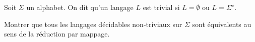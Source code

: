 
\begingroup

\begin{exercice}
  Soit $\Sigma$ un alphabet. 
  On dit qu'un langage $L$ est trivial si $L= \emptyset$ ou $L=\Sigma^\star$.
  \begin{questions}
  \item Montrer que tous les langages décidables non-triviaux sur $\Sigma$ sont équivalents au sens de la réduction par mappage.
  \end{questions}
\end{exercice}

\endgroup
\endinput
